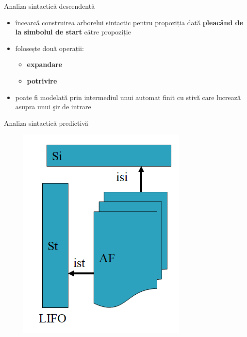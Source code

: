\documentclass[pdf]{beamer}
\begin{document}
\begin{frame}{Analiza sintactică descendentă}
\begin{itemize}
\item 
încearcă construirea arborelui sintactic pentru propoziția dată \textbf{pleacând de la simbolul de start} către propoziție

\item 
folosește două operații:

   \begin{itemize}
     \item 
     \textbf{expandare}
     \item
     \textbf{potrivire}
   \end{itemize}

\item
poate fi modelată prin intermediul unui automat finit cu stivă care lucrează asupra unui şir de intrare
\end{itemize}
\end{frame}



\begin{frame}{ Analiza sintactică predictivă}
\begin{figure}
\centering
\includegraphics[scale=0.75]{img/afs}
\end{figure}

\end{frame}
\end{document}
